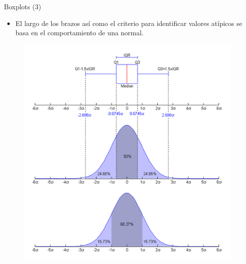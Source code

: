 \documentclass[handout]{beamer}
\begin{document}
\begin{frame}{Boxplots (3)}
\scriptsize{
\begin{itemize}
 \item El largo de los brazos así como el criterio para identificar valores atípicos se basa en el comportamiento de una normal.
\end{itemize}

\begin{figure}[h!]
	\centering
	\includegraphics[scale=0.35]{pics/Boxplot_vs_PDF.png}
	
	
	
\end{figure} 
}
\end{frame}
\end{document}
